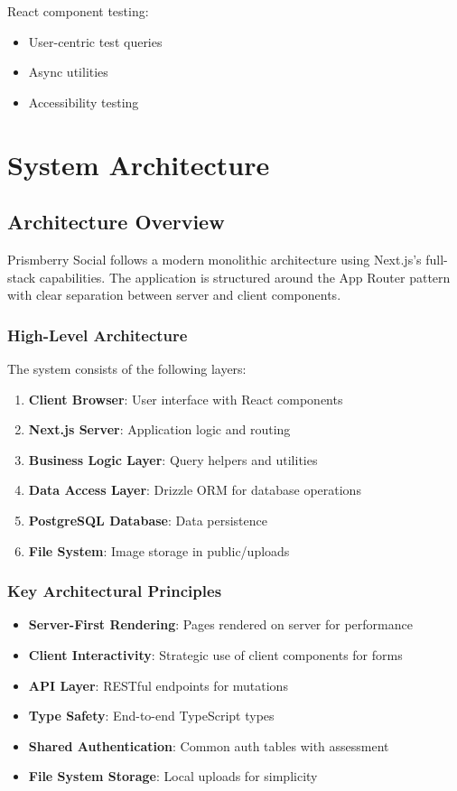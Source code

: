 \documentclass[12pt,a4paper]{report}
\begin{document}
React component testing:
\begin{itemize}
    \item User-centric test queries
    \item Async utilities
    \item Accessibility testing
\end{itemize}

\chapter{System Architecture}

\section{Architecture Overview}

Prismberry Social follows a modern monolithic architecture using Next.js's full-stack capabilities. The application is structured around the App Router pattern with clear separation between server and client components.

\subsection{High-Level Architecture}

The system consists of the following layers:

\begin{enumerate}
    \item \textbf{Client Browser}: User interface with React components
    \item \textbf{Next.js Server}: Application logic and routing
    \item \textbf{Business Logic Layer}: Query helpers and utilities
    \item \textbf{Data Access Layer}: Drizzle ORM for database operations
    \item \textbf{PostgreSQL Database}: Data persistence
    \item \textbf{File System}: Image storage in public/uploads
\end{enumerate}

\subsection{Key Architectural Principles}

\begin{itemize}
    \item \textbf{Server-First Rendering}: Pages rendered on server for performance
    \item \textbf{Client Interactivity}: Strategic use of client components for forms
    \item \textbf{API Layer}: RESTful endpoints for mutations
    \item \textbf{Type Safety}: End-to-end TypeScript types
    \item \textbf{Shared Authentication}: Common auth tables with assessment
    \item \textbf{File System Storage}: Local uploads for simplicity
\end{itemize}
\end{document}
